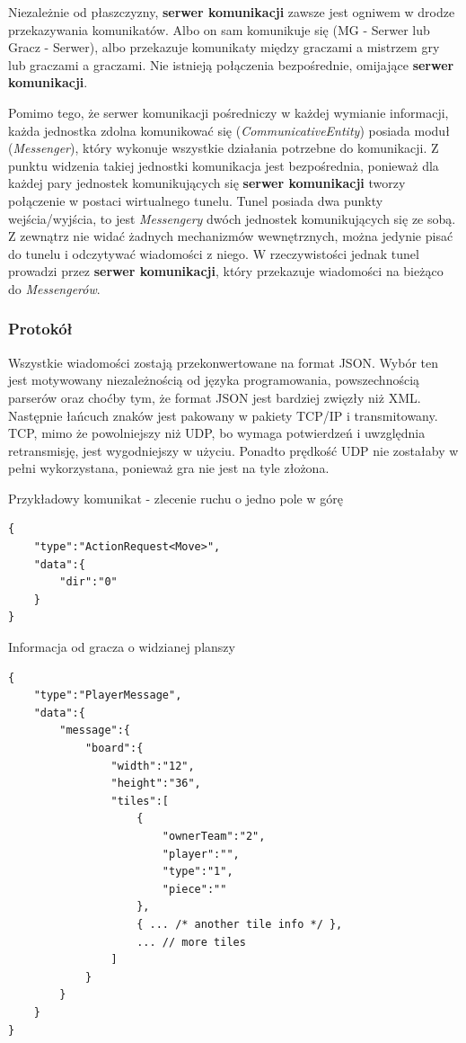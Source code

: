 \documentclass[11pt]{article}
\let\Oldsubsubsection\subsubsection
\renewcommand{\subsubsection}{\FloatBarrier\Oldsubsubsection}
\begin{document}
\par
Niezależnie od płaszczyzny, \textbf{serwer komunikacji} zawsze jest ogniwem w drodze przekazywania komunikatów. Albo on sam komunikuje się (MG - Serwer lub Gracz - Serwer), albo przekazuje komunikaty między graczami a mistrzem gry lub graczami a graczami. Nie istnieją połączenia bezpośrednie, omijające \textbf{serwer komunikacji}.
\par
Pomimo tego, że serwer komunikacji pośredniczy w każdej wymianie informacji, każda jednostka zdolna komunikować się (\textit{CommunicativeEntity}) posiada moduł (\textit{Messenger}), który wykonuje wszystkie działania potrzebne do komunikacji. Z punktu widzenia takiej jednostki komunikacja jest bezpośrednia, ponieważ dla każdej pary jednostek komunikujących się \textbf{serwer komunikacji} tworzy połączenie w postaci wirtualnego tunelu. Tunel posiada dwa punkty wejścia/wyjścia, to jest \textit{Messengery} dwóch jednostek komunikujących się ze sobą. Z zewnątrz nie widać żadnych mechanizmów wewnętrznych, można jedynie pisać do tunelu i odczytywać wiadomości z niego. W rzeczywistości jednak tunel prowadzi przez \textbf{serwer komunikacji}, który przekazuje wiadomości na bieżąco do \textit{Messengerów}.

\subsubsection{Protokół}
\par
Wszystkie wiadomości zostają przekonwertowane na format JSON. Wybór ten jest motywowany niezależnością od języka programowania, powszechnością parserów oraz choćby tym, że format JSON jest bardziej zwięzły niż XML. Następnie łańcuch znaków jest pakowany w pakiety TCP/IP i transmitowany. TCP, mimo że powolniejszy niż UDP, bo wymaga potwierdzeń i uwzględnia retransmisję, jest wygodniejszy w użyciu. Ponadto prędkość UDP nie zostałaby w pełni wykorzystana, ponieważ gra nie jest na tyle złożona.

\lstset{tabsize=2}
\begin{json}
\caption{Przykładowy komunikat - zlecenie ruchu o jedno pole w górę}
\begin{lstlisting}
{ 
	"type":"ActionRequest<Move>",
	"data":{
		"dir":"0"
	}
}
\end{lstlisting}
\end{json}

\begin{json}
\caption{Informacja od gracza o widzianej planszy}
\begin{lstlisting}
{ 
	"type":"PlayerMessage",
	"data":{
		"message":{
			"board":{
				"width":"12",
				"height":"36",
				"tiles":[
					{
						"ownerTeam":"2",
						"player":"",
						"type":"1",
						"piece":""
					},
					{ ... /* another tile info */ },
					... // more tiles
				]
			}
		}
	}
}
\end{lstlisting}
\end{json}
\end{document}
